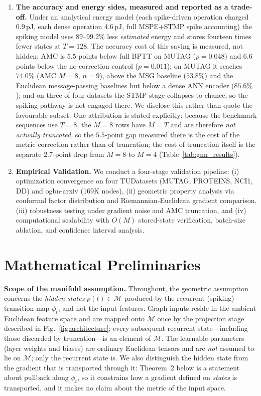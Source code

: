 \documentclass[a4paper,fleqn]{cas-dc}
\begin{document}
\begin{enumerate}
    \item \textbf{The accuracy and energy sides, measured and reported as a trade-off.} Under an analytical energy model (each spike-driven operation charged $0.9$\,pJ, each dense operation $4.6$\,pJ, full MSPE$+$STMP spike accounting) the spiking model uses $89$--$99.2\%$ less \emph{estimated} energy and stores fourteen times fewer states at $T{=}128$. The accuracy cost of this saving is measured, not hidden: AMC is $5.5$ points below full BPTT on MUTAG ($p{=}0.048$) and $6.6$ points below the no-correction control ($p{=}0.011$); on MUTAG it reaches $74.0\%$ (AMC $M{=}8$, $n{=}9$), above the MSG baseline ($53.8\%$) and the Euclidean message-passing baselines but below a dense ANN encoder ($85.6\%$); and on three of four datasets the STMP stage collapses to chance, so the spiking pathway is not engaged there. We disclose this rather than quote the favourable subset. One attribution is stated explicitly: because the benchmark sequences use $T{=}8$, the $M{=}8$ rows have $M{=}T$ and are therefore \emph{not actually truncated}, so the $5.5$-point gap measured there is the cost of the metric correction rather than of truncation; the cost of truncation itself is the separate $2.7$-point drop from $M{=}8$ to $M{=}4$ (Table~\ref{tab:gnn_results}).
    
    \item \textbf{Empirical Validation.} We conduct a four-stage validation pipeline: (i) optimization convergence on four TUDatasets (MUTAG, PROTEINS, NCI1, DD) and ogbn-arxiv (169K nodes), (ii) geometric property analysis via conformal factor distribution and Riemannian-Euclidean gradient comparison, (iii) robustness testing under gradient noise and AMC truncation, and (iv) computational scalability with $O(M)$ stored-state verification, batch-size ablation, and confidence interval analysis.
\end{enumerate}

\section{Mathematical Preliminaries}
\label{sec:prelim}

\textbf{Scope of the manifold assumption.} Throughout, the geometric assumption concerns the \emph{hidden states} $p(t)\in\mathcal{M}$ produced by the recurrent (spiking) transition map $\phi_t$, and not the input features. Graph inputs reside in the ambient Euclidean feature space and are mapped onto $\mathcal{M}$ once by the projection stage described in Fig.~\ref{fig:architecture}; every subsequent recurrent state---including those discarded by truncation---is an element of $\mathcal{M}$. The learnable parameters (layer weights and biases) are ordinary Euclidean tensors and are \emph{not} assumed to lie on $\mathcal{M}$; only the recurrent state is. We also distinguish the hidden state from the gradient that is transported through it: Theorem~2 below is a statement about pullback along $\phi_t$, so it constrains how a gradient defined on \emph{states} is transported, and it makes no claim about the metric of the input space.
\end{document}
